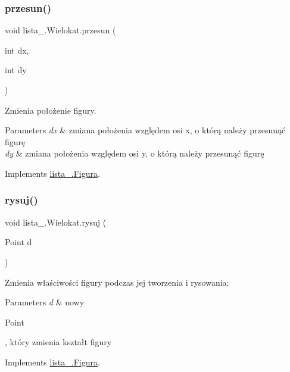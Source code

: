 \subsubsection{\texorpdfstring{przesun()}{przesun()}}
{\footnotesize\ttfamily void lista\+\_.\+Wielokat.\+przesun (\begin{DoxyParamCaption}\item[{int}]{dx,  }\item[{int}]{dy }\end{DoxyParamCaption})}

Zmienia położenie figury. 
\begin{DoxyParams}{Parameters}
{\em dx} & zmiana położenia względem osi x, o którą należy przesunąć figurę \\
\hline
{\em dy} & zmiana położenia względem osi y, o którą należy przesunąć figurę\\
\hline
\end{DoxyParams}
 

Implements \mbox{\hyperlink{interfacelista__5_1_1_figura_a72f085618cf604e8b1632ea733043861}{lista\+\_.\+Figura}}.

\mbox{\label{classlista__5_1_1_wielokat_aca4b29bcec579f442ac566ec3be96d84}} 
\subsubsection{\texorpdfstring{rysuj()}{rysuj()}}
{\footnotesize\ttfamily void lista\+\_.\+Wielokat.\+rysuj (\begin{DoxyParamCaption}\item[{Point}]{d }\end{DoxyParamCaption})}

Zmienia właściwości figury podczas jej tworzenia i rysowania; 
\begin{DoxyParams}{Parameters}
{\em d} & nowy
\begin{DoxyCode}
Point 
\end{DoxyCode}
 , który zmienia kształt figury\\
\hline
\end{DoxyParams}
 

Implements \mbox{\hyperlink{interfacelista__5_1_1_figura_a1b238957bac675c57febc970067dfd6d}{lista\+\_.\+Figura}}.

\mbox{\label{classlista__5_1_1_wielokat_a8498454fc73a25ba038d48e04bb1e8c0}} 
